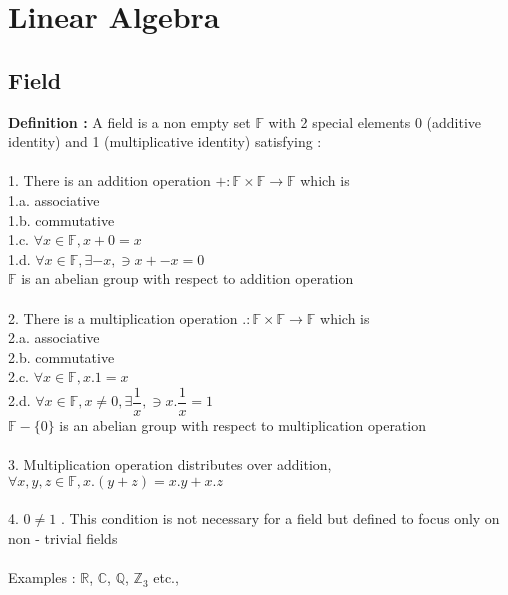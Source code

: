 \documentclass{article}
\begin{document}
    \section{Linear Algebra}
    \subsection{Field}
    \textbf{Definition : }A field is a non empty set $\mathbb{F}$ with 2 special elements 0 (additive identity) and 1 (multiplicative identity) satisfying : \\ \\
    1. There is an addition operation $ + : \mathbb{F} \times \mathbb{F} \rightarrow \mathbb{F} $ which is\\
    1.a. associative \\
    1.b. commutative \\
    1.c. $\forall x \in \mathbb{F} , x + 0 = x$ \\
    1.d. $\forall x \in \mathbb{F} , \exists -x , \ni x + -x = 0$ \\
    $\mathbb{F}$ is an abelian group with respect to addition operation \\ \\
    2. There is a multiplication operation $. : \mathbb{F} \times \mathbb{F} \rightarrow \mathbb{F} $ which is\\
    2.a. associative \\
    2.b. commutative \\
    2.c. $\forall x \in \mathbb{F} , x . 1 = x$ \\
    2.d. $\forall x \in \mathbb{F} , x \neq 0 , \exists \dfrac{1}{x} , \ni x . \dfrac{1}{x} = 1$ \\
    $\mathbb{F} - \{0\}$ is an abelian group with respect to multiplication operation \\ \\
    3. Multiplication operation distributes over addition, $\forall x, y, z \in \mathbb{F}, x . (y + z) = x.y + x.z $ \\ \\
    4. $0 \neq 1$ . This condition is not necessary for a field but defined to focus only on non - trivial fields \\ \\
    Examples : $\mathbb{R}$, $\mathbb{C}$, $\mathbb{Q}$, $\mathbb{Z}_3$ etc.,
\end{document}
